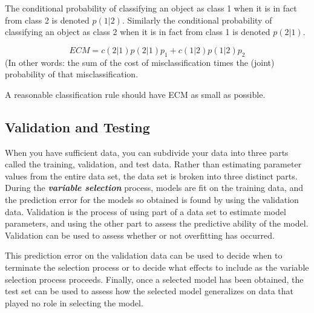 \documentclass[a4paper,12pt]{article}
\begin{document}
The conditional probability of classifying an object as class 1 when it is in fact from
class 2 is denoted $p(1|2)$.
Similarly the conditional probability of classifying an object as class 2 when it is in
fact from class 1 is denoted $p(2|1)$.

\[ECM = c(2|1)p(2|1)p_1 + c(1|2)p(1|2)p_2\]
(In other words: the sum of the cost of misclassification times the (joint) probability of that misclassification.

A reasonable classification rule should have ECM as small as possible.




\subsection{Validation and Testing}
When you have sufficient data, you can subdivide your data into three parts called the training, validation, and test data. Rather than estimating parameter values from the entire data set, the data set is broken into three distinct parts. During the \textbf{\textit{variable selection}} process, models are fit on the training data, and the prediction error for the models so obtained is found by using the validation data. Validation is the process of using part of a data set to estimate model parameters, and using the other part to assess the predictive ability of the model. Validation can be used to assess whether or not overfitting has occurred.

This prediction error on the validation data can be used to decide when to terminate the selection process or to decide what effects to include as the variable selection process proceeds. Finally, once a selected model has been obtained, the test set can be used to assess how the selected model generalizes on data that played no role in selecting the model.
\end{document}
